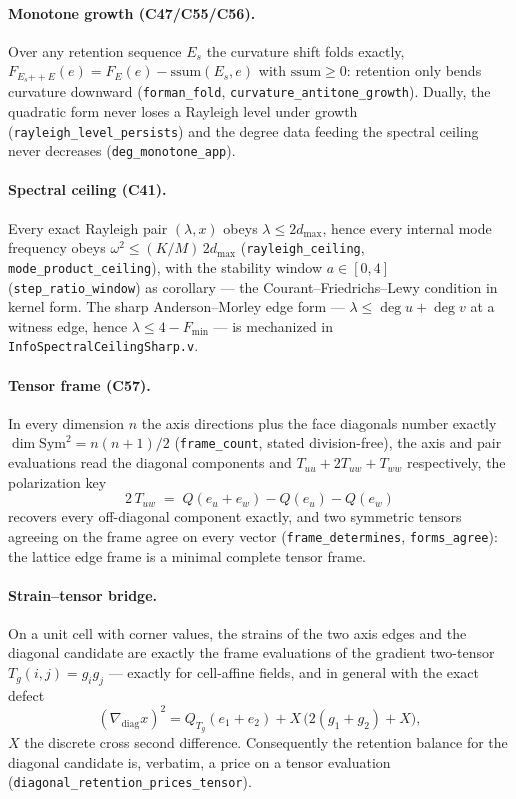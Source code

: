 \documentclass[10pt,twocolumn]{article}
\theoremstyle{definition}
\newcommand{\code}[1]{\texttt{#1}}
\begin{document}
\paragraph{Monotone growth (C47/C55/C56).} Over any retention sequence $E_s$ the
curvature shift folds exactly, $F_{E_s{+\!+}E}(e) = F_E(e) - \mathrm{ssum}(E_s,e)$
with $\mathrm{ssum}\ge 0$: retention only bends curvature downward
(\code{forman\_fold}, \code{curvature\_antitone\_growth}). Dually, the quadratic form
never loses a Rayleigh level under growth (\code{rayleigh\_level\_persists}) and the
degree data feeding the spectral ceiling never decreases
(\code{deg\_monotone\_app}).

\paragraph{Spectral ceiling (C41).} Every exact Rayleigh pair \cite{rayleigh}
$(\lambda,x)$ obeys $\lambda \le 2 d_{\max}$, hence every internal mode frequency obeys
$\omega^2 \le (K/M)\,2 d_{\max}$ (\code{rayleigh\_ceiling},
\code{mode\_product\_ceiling}), with the stability window $a\in[0,4]$
(\code{step\_ratio\_window}) as corollary --- the
Courant--Friedrichs--Lewy condition \cite{cfl} in kernel form. The sharp
Anderson--Morley edge form --- $\lambda \le \deg u + \deg v$ at a witness edge,
hence $\lambda \le 4 - F_{\min}$ --- is mechanized in
\code{InfoSpectralCeilingSharp.v}.

\paragraph{Tensor frame (C57).} In every dimension $n$ the axis directions plus the
face diagonals number exactly $\dim \mathrm{Sym}^2 = n(n+1)/2$
(\code{frame\_count}, stated division-free), the axis and pair evaluations read the
diagonal components and $T_{uu}+2T_{uw}+T_{ww}$ respectively, the polarization key
\begin{equation}
2\,T_{uw} \;=\; Q(e_u{+}e_w) - Q(e_u) - Q(e_w)
\label{eq:polar}
\end{equation}
recovers every off-diagonal component exactly, and two symmetric tensors agreeing on
the frame agree on every vector (\code{frame\_determines}, \code{forms\_agree}): the
lattice edge frame is a minimal complete tensor frame.

\paragraph{Strain--tensor bridge.} On a unit cell with corner values, the strains of
the two axis edges and the diagonal candidate are exactly the frame evaluations of the
gradient two-tensor $T_g(i,j) = g_i g_j$ --- exactly for cell-affine fields, and in
general with the exact defect
\begin{equation}
(\nabla_{\!\mathrm{diag}}x)^2 = Q_{T_g}(e_1{+}e_2) + X\,\bigl(2(g_1{+}g_2)+X\bigr),
\label{eq:defect}
\end{equation}
$X$ the discrete cross second difference. Consequently the retention balance for the
diagonal candidate is, verbatim, a price on a tensor evaluation
(\code{diagonal\_retention\_prices\_tensor}).
\end{document}
